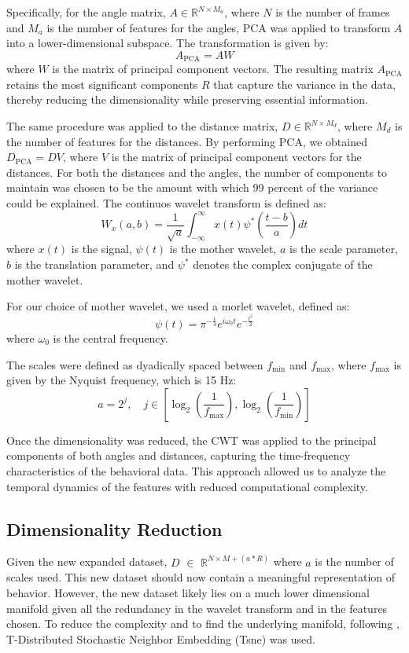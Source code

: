\documentclass[12pt,english]{article}
\begin{document}
Specifically, for the angle matrix, \( A \in \mathbb{R}^{N \times M_{a}} \), where \( N \) is the number of frames and \( M_{a} \) is the number of features for the angles, PCA was applied to transform \( A \) into a lower-dimensional subspace. The transformation is given by:
\[
A_{\text{PCA}} = A W
\]
where \( W \) is the matrix of principal component vectors. The resulting matrix \( A_{\text{PCA}} \) retains the most significant components \( R \) that capture the variance in the data, thereby reducing the dimensionality while preserving essential information.

The same procedure was applied to the distance matrix, \( D \in \mathbb{R}^{N \times M_{d}} \), where \( M_{d} \) is the number of features for the distances. By performing PCA, we obtained \( D_{\text{PCA}} = D V \), where \( V \) is the matrix of principal component vectors for the distances. For both the distances and the angles, the number of components to maintain was chosen to be the amount with which 99 percent of the variance could be explained. 
The continuos wavelet transform is defined as:
\[
W_x(a, b) = \frac{1}{\sqrt{a}} \int_{-\infty}^{\infty} x(t) \psi^*\left(\frac{t - b}{a}\right) dt
\]
where \( x(t) \) is the signal, \( \psi(t) \) is the mother wavelet, \( a \) is the scale parameter, \( b \) is the translation parameter, and \( \psi^* \) denotes the complex conjugate of the mother wavelet.

For our choice of mother wavelet, we used a morlet wavelet, defined as:
\[
\psi(t) = \pi^{-\frac{1}{4}} e^{i \omega_0 t} e^{-\frac{t^2}{2}}
\]
where \( \omega_0 \) is the central frequency. 

The scales were defined as dyadically spaced between \( f_{\min} \) and \( f_{\max} \), where \( f_{\max} \) is given by the Nyquist frequency, which is 15 Hz:
\[
a = 2^j, \quad j \in \left[\log_2\left(\frac{1}{f_{\max}}\right), \log_2\left(\frac{1}{f_{\min}}\right)\right]
\]


Once the dimensionality was reduced, the CWT was applied to the principal components of both angles and distances, capturing the time-frequency characteristics of the behavioral data. This approach allowed us to analyze the temporal dynamics of the features with reduced computational complexity.



\subsection{Dimensionality Reduction}
Given the new expanded dataset, \( D \) $\in$ \( \mathbb{R}^{N \times M+(a * R)} \) where \( a \) is the number of scales used. This new dataset should now contain a meaningful representation of behavior. However, the new dataset likely lies on a much lower dimensional manifold given all the redundancy in the wavelet transform and in the features chosen. To reduce the complexity and to find the underlying manifold, following \citep{bermanMappingStereotypedBehaviour2014}, T-Distributed Stochastic Neighbor Embedding \citep{maatenVisualizingDataUsing2008} (Tsne) was used. 
\end{document}
